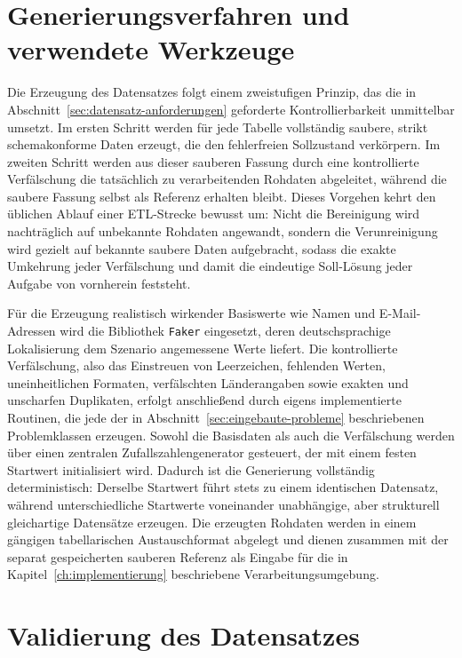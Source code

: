 \section{Generierungsverfahren und verwendete Werkzeuge}
\label{sec:generierung}

Die Erzeugung des Datensatzes folgt einem zweistufigen Prinzip, das die in Abschnitt~\ref{sec:datensatz-anforderungen} geforderte Kontrollierbarkeit unmittelbar umsetzt. Im ersten Schritt werden für jede Tabelle vollständig saubere, strikt schemakonforme Daten erzeugt, die den fehlerfreien Sollzustand verkörpern. Im zweiten Schritt werden aus dieser sauberen Fassung durch eine kontrollierte Verfälschung die tatsächlich zu verarbeitenden Rohdaten abgeleitet, während die saubere Fassung selbst als Referenz erhalten bleibt. Dieses Vorgehen kehrt den üblichen Ablauf einer \ac{ETL}-Strecke bewusst um: Nicht die Bereinigung wird nachträglich auf unbekannte Rohdaten angewandt, sondern die Verunreinigung wird gezielt auf bekannte saubere Daten aufgebracht, sodass die exakte Umkehrung jeder Verfälschung und damit die eindeutige Soll-Lösung jeder Aufgabe von vornherein feststeht.

Für die Erzeugung realistisch wirkender Basiswerte wie Namen und E-Mail-Adressen wird die Bibliothek \texttt{Faker} eingesetzt, deren deutschsprachige Lokalisierung dem Szenario angemessene Werte liefert. Die kontrollierte Verfälschung, also das Einstreuen von Leerzeichen, fehlenden Werten, uneinheitlichen Formaten, verfälschten Länderangaben sowie exakten und unscharfen Duplikaten, erfolgt anschließend durch eigens implementierte Routinen, die jede der in Abschnitt~\ref{sec:eingebaute-probleme} beschriebenen Problemklassen erzeugen. Sowohl die Basisdaten als auch die Verfälschung werden über einen zentralen Zufallszahlengenerator gesteuert, der mit einem festen Startwert initialisiert wird. Dadurch ist die Generierung vollständig deterministisch: Derselbe Startwert führt stets zu einem identischen Datensatz, während unterschiedliche Startwerte voneinander unabhängige, aber strukturell gleichartige Datensätze erzeugen. Die erzeugten Rohdaten werden in einem gängigen tabellarischen Austauschformat abgelegt und dienen zusammen mit der separat gespeicherten sauberen Referenz als Eingabe für die in Kapitel~\ref{ch:implementierung} beschriebene Verarbeitungsumgebung.

\section{Validierung des Datensatzes}
\label{sec:datensatz-validierung}

